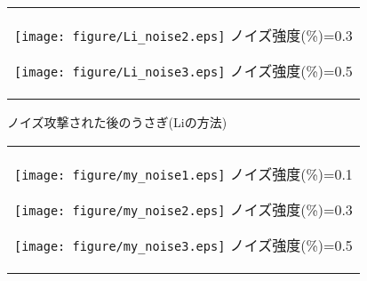 \documentclass[11pt]{jreport}
\begin{document}
{\begin{figure}[htbp]
\begin{center}
\begin{tabular}{c}
      \begin{minipage}{0.33\hsize}
        \begin{center}
          \texttt{[image: figure/Li\_noise2.eps]}
          \hspace{1.6cm} ノイズ強度(\%)=0.3
        \end{center}
      \end{minipage}

      \begin{minipage}{0.33\hsize}
        \begin{center}
          \texttt{[image: figure/Li\_noise3.eps]}
          \hspace{1.6cm} ノイズ強度(\%)=0.5
        \end{center}
      \end{minipage}

    \end{tabular}
    \caption{ノイズ攻撃された後のうさぎ(Liの方法)}
    \label{fig:noise1}
  \end{center}
\end{figure}



\begin{figure}[htbp]
  \begin{center}
    \begin{tabular}{c}

      \begin{minipage}{0.33\hsize}
        \begin{center}
          \texttt{[image: figure/my\_noise1.eps]}
          \hspace{1.6cm} ノイズ強度(\%)=0.1
        \end{center}
      \end{minipage}

      \begin{minipage}{0.33\hsize}
        \begin{center}
          \texttt{[image: figure/my\_noise2.eps]}
          \hspace{1.6cm} ノイズ強度(\%)=0.3
        \end{center}
      \end{minipage}

      \begin{minipage}{0.33\hsize}
        \begin{center}
          \texttt{[image: figure/my\_noise3.eps]}
          \hspace{1.6cm} ノイズ強度(\%)=0.5
        \end{center}
      \end{minipage}


\end{tabular}
\end{center}
\end{figure}}
\end{document}
